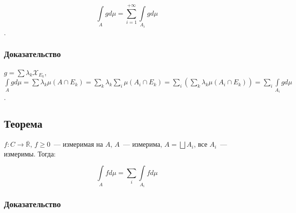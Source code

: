 \documentclass{article}
\begin{document}
            $$\int\limits_{A} g d \mu = \sum\limits_{i = 1}^{+\infty} \int\limits_{A_i} g d \mu$$.
            
            \subsubsection{Доказательство}
        
                $g = \sum \lambda_k \mathcal{X}_{E_k}$, $\int\limits_A g d \mu = \sum \lambda_k \mu (A \cap E_k) = \sum\limits_{k} \lambda_k \sum\limits_{i} \mu (A_i \cap E_k) = \sum\limits_i \left( \sum\limits_k \lambda_k \mu (A_i \cap E_k ) \right) = \sum\limits_i \int\limits_{A_i} g d \mu$.
            
        \subsection{Теорема}
    
            $f : C \rightarrow \overline{\mathbb{R}}$, $f \geqslant 0$~--- измеримая на $A$, $A$~--- измерима, $A = \bigsqcup A_i$, все $A_i$~--- измеримы. Тогда:
        
            $$\int\limits_{A} f d \mu = \sum\limits_{i} \int\limits_{A_i} f d \mu$$
            
            \subsubsection{Доказательство}
        
\end{document}
